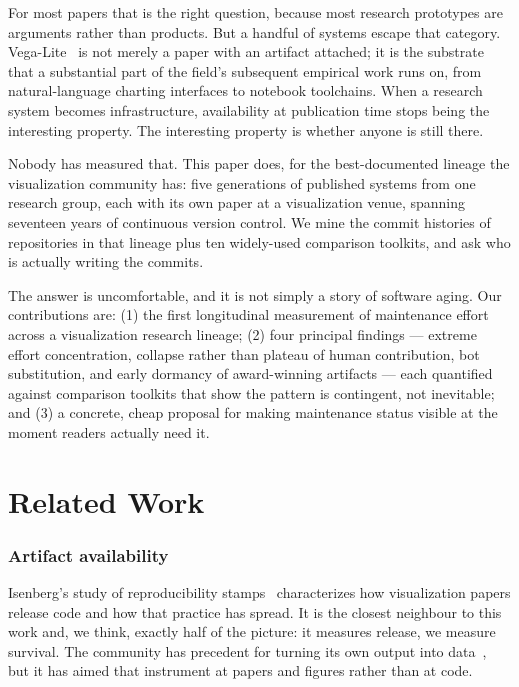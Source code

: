 \documentclass[9pt,twocolumn,letterpaper]{article}
\begin{document}
For most papers that is the right question, because most research prototypes
are arguments rather than products. But a handful of systems escape that
category. Vega-Lite~\cite{satyanarayan2017vegalite} is not merely a paper with
an artifact attached; it is the substrate that a substantial part of the
field's subsequent empirical work runs on, from natural-language charting
interfaces to notebook toolchains. When a research system becomes
infrastructure, availability at publication time stops being the interesting
property. The interesting property is whether anyone is still there.

Nobody has measured that. This paper does, for the best-documented lineage the
visualization community has: five generations of published systems from one
research group, each with its own paper at a visualization venue, spanning
seventeen years of continuous version control. We mine the commit histories of
\ecorepos{} repositories in that lineage plus ten widely-used comparison
toolkits, and ask who is actually writing the commits.

The answer is uncomfortable, and it is not simply a story of software aging.
Our contributions are: (1) the first longitudinal measurement of maintenance
effort across a visualization research lineage; (2) four principal findings --- extreme
effort concentration, collapse rather than plateau of human contribution, bot
substitution, and early dormancy of award-winning artifacts --- each quantified
against comparison toolkits that show the pattern is contingent, not
inevitable; and (3) a concrete, cheap proposal for making maintenance status
visible at the moment readers actually need it.

\section{Related Work}

\subsubsection{Artifact availability}
Isenberg's study of reproducibility stamps~\cite{isenberg2024stamps}
characterizes how visualization papers release code and how that practice has
spread. It is the closest neighbour to this work and, we think, exactly half of
the picture: it measures release, we measure survival. The community has
precedent for turning its own output into
data~\cite{isenberg2017vispubdata,chen2021vis30k}, but it has aimed that
instrument at papers and figures rather than at code.
\end{document}
